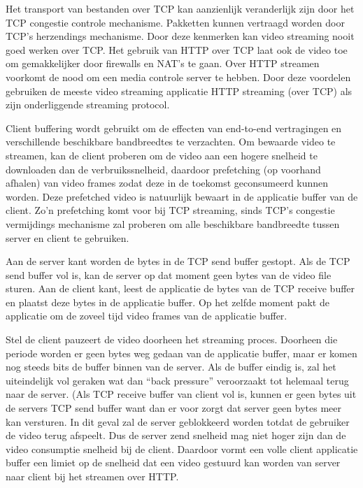 \noindent Het transport van bestanden over TCP kan aanzienlijk veranderlijk zijn door het TCP congestie controle mechanisme. Pakketten kunnen vertraagd worden door TCP's herzendings mechanisme. Door deze kenmerken kan video streaming nooit goed werken over TCP.
Het gebruik van HTTP over TCP laat ook de video toe om gemakkelijker door firewalls en NAT's te gaan. Over HTTP streamen voorkomt de nood om een media controle server te hebben. Door deze voordelen gebruiken de meeste video streaming applicatie HTTP streaming (over TCP) als zijn onderliggende streaming protocol.


\noindent Client buffering wordt gebruikt om de effecten van end-to-end vertragingen en verschillende beschikbare bandbreedtes te verzachten. Om bewaarde video te streamen, kan de client proberen om de video aan een hogere snelheid te downloaden dan de verbruikssnelheid, daardoor prefetching (op voorhand afhalen) van video frames zodat deze in de toekomst geconsumeerd kunnen worden. Deze prefetched video is natuurlijk bewaart in de applicatie buffer van de client. Zo’n prefetching komt voor bij TCP streaming, sinds TCP’s congestie vermijdings mechanisme zal proberen om alle beschikbare bandbreedte tussen server en client te gebruiken.


\noindent Aan de server kant worden de bytes in de TCP send buffer gestopt. Als de TCP send buffer vol is, kan de server op dat moment geen bytes van de video file sturen.
Aan de client kant, leest de applicatie de bytes van de TCP receive buffer en plaatst deze bytes in de applicatie buffer. Op het zelfde moment pakt de applicatie om de zoveel tijd video frames van de applicatie buffer.

\noindent Stel de client pauzeert de video doorheen het streaming proces. Doorheen die periode worden er geen bytes weg gedaan van de applicatie buffer, maar er komen nog steeds bits de buffer binnen van de server. Als de buffer eindig is, zal het uiteindelijk vol geraken wat dan “back pressure” veroorzaakt tot helemaal terug naar de server. (Als TCP receive buffer van client vol is, kunnen er geen bytes uit de servers TCP send buffer want dan er voor zorgt dat server geen bytes meer kan versturen. In dit geval zal de server geblokkeerd worden totdat de gebruiker de video terug afspeelt.
Dus de server zend snelheid mag niet hoger zijn dan de video consumptie snelheid bij de client. Daardoor vormt een volle client applicatie buffer een limiet op de snelheid dat een video gestuurd kan worden van server naar client bij het streamen over HTTP.


